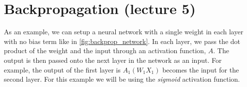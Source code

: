\documentclass[11pt]{article}
\numberwithin{equation}{section}
\theoremstyle{definition}%
\begin{document}

\section{Backpropagation (lecture 5)}



As an example, we can setup a neural network with a single weight in each layer with no bias term like in \autoref{fig:backprop_network}. In each layer, we pass the dot product of the weight and the input through an activation function, $A$. The output is then passed onto the next layer in the network as an input. For example, the output of the first layer is $A_1(W_1 X_1)$ becomes the input for the second layer. For this example we will be using the \emph{sigmoid} activation function.
\end{document}
